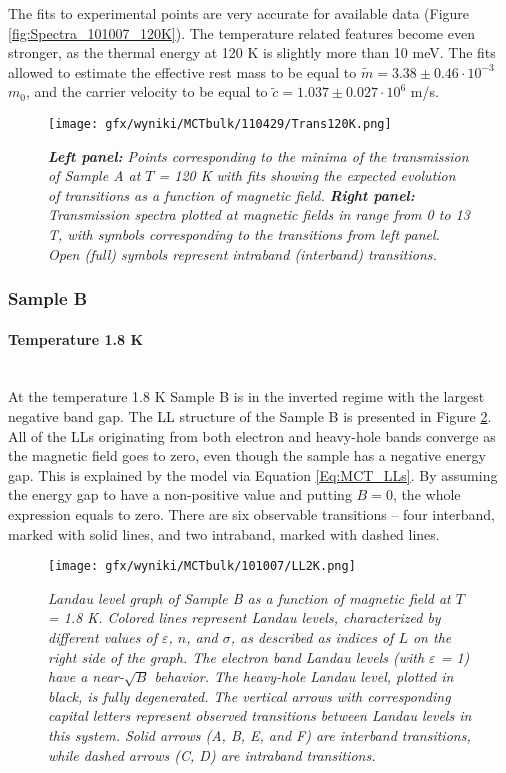 \documentclass[titlepage,a4paper]{book}
\newcommand{\wciecie}{\quad\phantom{v}}
\newcommand{\myparagraph}[1]{\paragraph{#1}\mbox{}\\}
\begin{document}
The fits to experimental points are very accurate for available data (Figure \ref{fig:Spectra_101007_120K}). The temperature related features become even stronger, as the thermal energy at 120 K is slightly more than 10 meV. The fits allowed to estimate the effective rest mass to be equal to $\tilde m = 3.38 \pm 0.46 \cdot 10^{-3}$ $m_0$, and the carrier velocity to be equal to $\tilde{c} = 1.037 \pm 0.027 \cdot 10^6$ m/s. 

\begin{figure}[ht]
	\centering
	\texttt{[image: gfx/wyniki/MCTbulk/110429/Trans120K.png]}
	\vspace{-10pt}
	\caption{\textit{\textbf{Left panel:} Points corresponding to the minima of the transmission of Sample A at $T$ = 120 K with fits showing the expected evolution of transitions as a function of magnetic field. \textbf{Right panel:} Transmission spectra plotted at magnetic fields in range from 0 to 13 T, with symbols corresponding to the transitions from left panel. Open (full) symbols represent intraband (interband) transitions.}}
	\label{fig:Spectra_110429_120K}
\end{figure}

\clearpage
\subsubsection{Sample B}
\myparagraph{Temperature 1.8 K}
\wciecie
At the temperature 1.8 K Sample B is in the inverted regime with the largest negative band gap. The LL structure of the Sample B is presented in Figure \ref{fig:LL_101007_2K}. All of the LLs originating from both electron and heavy-hole bands converge as the magnetic field goes to zero, even though the sample has a negative energy gap. This is explained by the model via Equation \ref{Eq:MCT_LLs}. By assuming the energy gap to have a non-positive value and putting $B = 0$, the whole expression equals to zero. There are six observable transitions -- four interband, marked with solid lines, and two intraband, marked with dashed lines.

\begin{figure}[ht]
	\centering
	\texttt{[image: gfx/wyniki/MCTbulk/101007/LL2K.png]}
	\vspace{-10pt}
	\caption{\textit{Landau level graph of Sample B as a function of magnetic field at $T$ = 1.8 K. Colored lines represent Landau levels, characterized by different values of $\varepsilon$, $n$, and $\sigma$, as described as indices of $L$ on the right side of the graph. The electron band Landau levels (with $\varepsilon$ = 1) have a near-$\sqrt{B}$ behavior. The heavy-hole Landau level, plotted in black, is fully degenerated. The vertical arrows with corresponding capital letters represent observed transitions between Landau levels in this system. Solid arrows (A, B, E, and F) are interband transitions, while dashed arrows (C, D) are intraband transitions.}}
	\label{fig:LL_101007_2K}
\end{figure}
\end{document}
